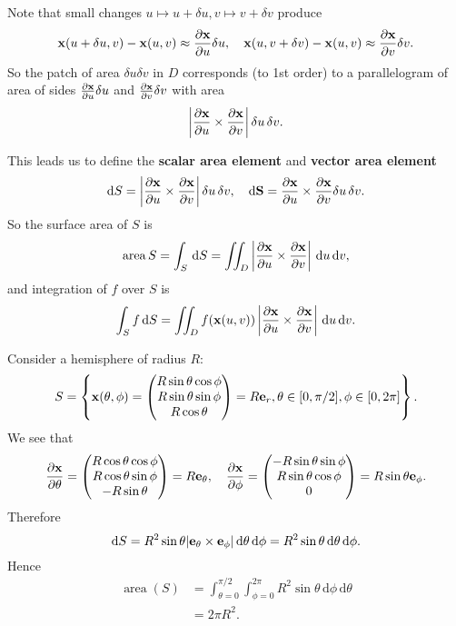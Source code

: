 Note that small changes $ u \mapsto u+\delta u,v \mapsto v+\delta v $ produce 
\[
    {\bf x}(u+\delta u,v)-{\bf x}(u,v) \approx \frac{\partial {\bf x}}{\partial u}\delta u ,\quad {\bf x}(u,v+\delta v)-{\bf x}(u,v) \approx \frac{\partial {\bf x}}{\partial v}\delta v.
\]
So the patch of area $ \delta u \delta v $ in $D$ corresponds (to 1st order) to a parallelogram of area of sides $ \frac{\partial {\bf x}}{\partial u}\delta u  $ and $ \frac{\partial {\bf x}}{\partial v}\delta v  $ with area 
\[
    \left| \frac{\partial {\bf x}}{\partial u}\times \frac{\partial {\bf x}}{\partial v} \right| \delta u \,\delta v.
\]

This leads us to define the \textbf{scalar area element} and \textbf{vector area element}
\[
    \mathrm{d} S = \left| \frac{\partial {\bf x}}{\partial u}\times \frac{\partial {\bf x}}{\partial v} \right| \delta u \,\delta v,\quad \mathrm{d} {\bf S} = \frac{\partial {\bf x}}{\partial u}\times \frac{\partial {\bf x}}{\partial v}  \delta u \,\delta v.
\]
So the surface area of $S$ is 
\[
    \operatorname{area} S = \int_{S} \,\mathrm{d}S = \iint_{D} \left| \frac{\partial {\bf x}}{\partial u}\times \frac{\partial {\bf x}}{\partial v} \right| \,\mathrm{d} u \,\mathrm{d} v,
\]
and integration of $f$ over $S$ is 
\[
    \int_{S} f \,\mathrm{d}S = \iint_{D} f({\bf x}(u,v)) \left| \frac{\partial {\bf x}}{\partial u}\times \frac{\partial {\bf x}}{\partial v} \right| \,\mathrm{d} u \,\mathrm{d} v.
\]

\begin{example}
    Consider a hemisphere of radius $R$:
    \[
        S = \left\{ {\bf x}(\theta,\phi) = \begin{pmatrix}
           R \sin \theta \cos \phi \\ R\sin \theta \sin \phi \\ R\cos \theta
        \end{pmatrix}=R{\bf e}_r,\theta\in [0,\pi/2],\phi\in [0,2\pi]\right\}.
    \]
    We see that 
    \[
        \frac{\partial {\bf x}}{\partial \theta} =  \begin{pmatrix}
            R \cos \theta \cos \phi \\ R\cos \theta \sin \phi \\ -R\sin \theta
         \end{pmatrix}=R{\bf e}_\theta,\quad
        \frac{\partial {\bf x}}{\partial \phi}= \begin{pmatrix}
            -R \sin \theta \sin \phi \\ R\sin \theta \cos \phi \\ 0
         \end{pmatrix}=R \sin \theta {\bf e}_\phi.
    \]
    Therefore 
    \[
        \mathrm{d} S = R^2 \sin \theta |{\bf e}_\theta\times {\bf e}_\phi| \,\mathrm{d} \theta\,\mathrm{d} \phi = R^2 \sin \theta\,\mathrm{d} \theta\,\mathrm{d} \phi.
    \]
    Hence 
    \begin{align*}
        \operatorname{area}(S) &= \int_{\theta=0}^{\pi/2} \int_{\phi=0}^{2\pi} R^2 \sin \theta \,\mathrm{d}\phi  \,\mathrm{d}\theta\\ 
        &= 2\pi R^2.
    \end{align*}
\end{example}

